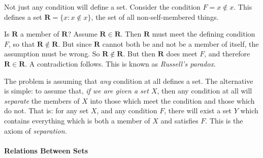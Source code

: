  Not just any condition will define a set. Consider the condition $F = x \notin x$. This defines a set $\mathbf{R} = \{x: x\notin x\}$, the set of all non-self-membered things.

 Is $\mathbf{R}$ a member of $\mathbf{R}$? Assume $\mathbf{R} \in \mathbf{R}$. Then $\mathbf{R}$ must meet the defining condition $F$, so that $\mathbf{R} \notin \mathbf{R}$. But since $\mathbf{R}$ cannot both be and not be a member of itself, the assumption must be wrong. So $\mathbf{R}\notin \mathbf{R}$. But then $\mathbf{R}$ does meet $F$, and therefore $\mathbf{R} \in \mathbf{R}$. A contradiction follows. This is known as \emph{Russell's paradox}.

The problem is assuming that \emph{any} condition at all defines a set. The alternative is simple: to assume that, \emph{if we are given a set $X$}, then any condition at all will \emph{separate} the members of $X$ into those which meet the condition and those which do not. That is: for any set $X$, and any condition $F$, there will exist a set $Y$ which contains everything which is both a member of $X$ and satisfies $F$. This is the axiom of \emph{separation}.


\paragraph{Relations Between Sets}

